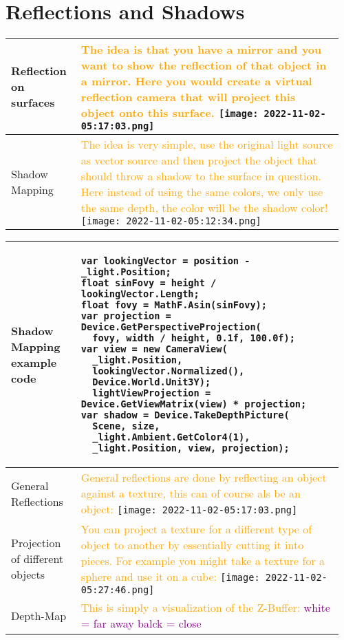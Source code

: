 \documentclass[main.tex,fontsize=8pt,paper=a4,paper=portrait,DIV=calc,]{scrartcl}
\begin{document}
\begin{table}[ht!]
\section{Reflections and Shadows}
\begin{tabular}{|m{0.2\linewidth}|m{0.755\linewidth}|}
\hline 
Reflection on surfaces & 
\textcolor{orange}{The idea is that you have a mirror and you want to show the reflection of that object in a mirror. Here you would create a virtual reflection camera that will project this object onto this surface.}\newline
\texttt{[image: 2022-11-02-05:17:03.png]}\\
\hline
Shadow Mapping & 
\textcolor{orange}{The idea is very simple, use the original light source as vector source and then project the object that should throw a shadow to the surface in question. \newline
Here instead of using the same colors, we only use the same depth, the color will be the shadow color!}\newline
\texttt{[image: 2022-11-02-05:12:34.png]}\\
\hline
\end{tabular}
\end{table}
\pagebreak
\begin{table}[ht!]
\begin{tabular}{|m{0.2\linewidth}|m{0.755\linewidth}|}
\hline 
Shadow Mapping example code &
\vspace{2mm}
\begin{lstlisting}
var lookingVector = position - _light.Position;
float sinFovy = height / lookingVector.Length;
float fovy = MathF.Asin(sinFovy);
var projection = Device.GetPerspectiveProjection(
  fovy, width / height, 0.1f, 100.0f);
var view = new CameraView(
  _light.Position,
  lookingVector.Normalized(),
  Device.World.Unit3Y);
  lightViewProjection = Device.GetViewMatrix(view) * projection;
var shadow = Device.TakeDepthPicture(
  Scene, size,
  _light.Ambient.GetColor4(1),
  _light.Position, view, projection);
\end{lstlisting}\\
\hline
General Reflections & 
\textcolor{orange}{General reflections are done by reflecting an object against a texture, this can of course als be an object:}\newline
\texttt{[image: 2022-11-02-05:17:03.png]}\\
\hline
Projection of different objects & 
\textcolor{orange}{You can project a texture for a different type of object to another by essentially cutting it into pieces. For example you might take a texture for a sphere and use it on a cube:}\newline
\texttt{[image: 2022-11-02-05:27:46.png]}\\
\hline
Depth-Map&
\textcolor{orange}{This is simply a visualization of the Z-Buffer:}\newline
\textcolor{purple}{white = far away\newline
balck = close}\\
\hline
\end{tabular}
\end{table}
\end{document}
